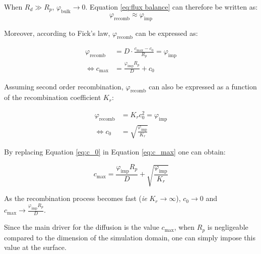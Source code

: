 When $R_d \gg R_p$, $\varphi_\mathrm{bulk} \rightarrow 0$.
Equation \ref{eq:flux balance} can therefore be written as:
\begin{equation}
    \varphi_\mathrm{recomb} \approx \varphi_\mathrm{imp}
    \label{eq:flux balance 2}
\end{equation}

Moreover, according to Fick's law, $\varphi_\mathrm{recomb}$ can be expressed as:

\begin{eqnarray}
    \varphi_\mathrm{recomb} &= D \cdot \frac{c_\mathrm{max}-c_{0}}{R_{p}} = \varphi_\mathrm{imp}\\
    \Leftrightarrow c_\mathrm{max} &= \frac{\varphi_\mathrm{imp} R_{p}}{D}+ c_0
    \label{eq:c_max}
\end{eqnarray}

Assuming second order recombination, $\varphi_\mathrm{recomb}$ can also be expressed as a function of the recombination coefficient $K_r$:

\begin{eqnarray}
    \varphi_\mathrm{recomb} &= K_r c_{0}^{2} = \varphi_\mathrm{imp}\\
    \Leftrightarrow c_{0} &= \sqrt{\frac{\varphi_\mathrm{imp}}{K_r}}
    \label{eq:c_0}
\end{eqnarray}

By replacing Equation \ref{eq:c_0} in Equation \ref{eq:c_max} one can obtain:

\begin{equation}
    c_\mathrm{max} = \frac{\varphi_\mathrm{imp} R_{p}}{D}+\sqrt{\frac{\varphi_\mathrm{imp}}{K_r}}
\end{equation}

As the recombination process becomes fast (\textit{ie} $K_r \rightarrow \infty$), $c_0 \rightarrow 0$ and $c_\mathrm{max} \rightarrow \frac{\varphi_\mathrm{imp} R_{p}}{D}$.

Since the main driver for the diffusion is the value $c_\mathrm{max}$, when $R_p$ is negligeable compared to the dimension of the simulation domain, one can simply impose this value at the surface.

